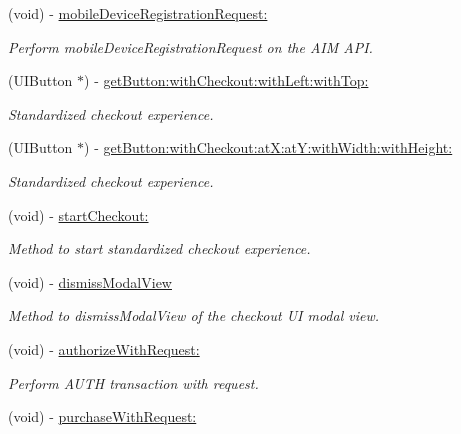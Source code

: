 \begin{DoxyCompactItemize}
(void) -\/ \hyperlink{interface_auth_net_a85da8b448835e5dc865772a5fbe2527e}{mobileDeviceRegistrationRequest:}
\begin{DoxyCompactList}\small\item\em Perform mobileDeviceRegistrationRequest on the AIM API. \item\end{DoxyCompactList}\item 
(UIButton $\ast$) -\/ \hyperlink{interface_auth_net_af2379b1db2c4a14d5dda010f81a2c3cb}{getButton:withCheckout:withLeft:withTop:}
\begin{DoxyCompactList}\small\item\em Standardized checkout experience. \item\end{DoxyCompactList}\item 
(UIButton $\ast$) -\/ \hyperlink{interface_auth_net_a14b9eb10d8c3702b4f89eac53076c621}{getButton:withCheckout:atX:atY:withWidth:withHeight:}
\begin{DoxyCompactList}\small\item\em Standardized checkout experience. \item\end{DoxyCompactList}\item 
(void) -\/ \hyperlink{interface_auth_net_a20baaa2b91fc9778de02bef1d007cda4}{startCheckout:}
\begin{DoxyCompactList}\small\item\em Method to start standardized checkout experience. \item\end{DoxyCompactList}\item 
(void) -\/ \hyperlink{interface_auth_net_ab910773060178d13fbc24394f9bc1ab1}{dismissModalView}
\begin{DoxyCompactList}\small\item\em Method to dismissModalView of the checkout UI modal view. \item\end{DoxyCompactList}\item 
(void) -\/ \hyperlink{interface_auth_net_ae8435d36d1a6d00e6e771a9fa58ec210}{authorizeWithRequest:}
\begin{DoxyCompactList}\small\item\em Perform AUTH transaction with request. \item\end{DoxyCompactList}\item 
(void) -\/ \hyperlink{interface_auth_net_a466bfa76518d3dd27fc7eb38a7967812}{purchaseWithRequest:}

\end{DoxyCompactItemize}
